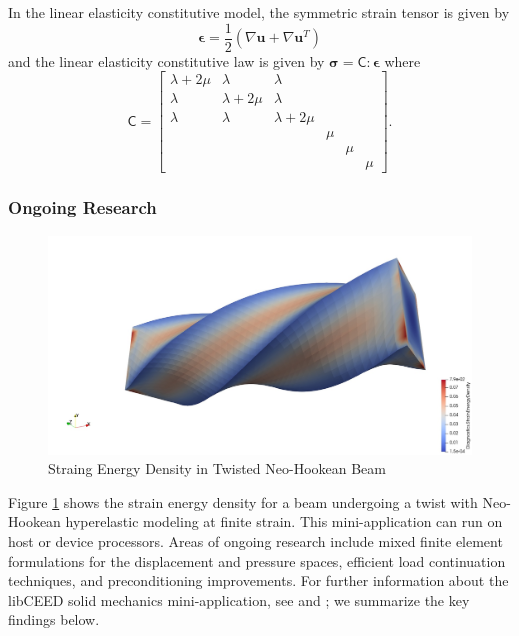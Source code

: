 In the linear elasticity constitutive model, the symmetric strain tensor is given by
\begin{equation}
\boldsymbol{\epsilon} = \frac{1}{2} \left( \nabla \mathbf{u} + \nabla \mathbf{u}^T \right)
\end{equation}
and the linear elasticity constitutive law is given by $\boldsymbol{\sigma} = \mathsf{C} : \boldsymbol{\epsilon}$ where
\begin{equation}
\mathsf{C} =
\begin{bmatrix}
   \lambda + 2\mu & \lambda & \lambda & & & \\
   \lambda & \lambda + 2\mu & \lambda & & & \\
   \lambda & \lambda & \lambda + 2\mu & & & \\
   & & & \mu & & \\
   & & & & \mu & \\
   & & & & & \mu
\end{bmatrix}.
\end{equation}

\subsubsection{Ongoing Research}

\begin{figure}[ht!]
\includegraphics[width=.99\linewidth]{../img/SolidTwistExample}
\caption{Straing Energy Density in Twisted Neo-Hookean Beam}
\label{fig:solidtwist}
\end{figure}

Figure \ref{fig:solidtwist} shows the strain energy density for a beam undergoing a twist with Neo-Hookean hyperelastic modeling at finite strain.
This mini-application can run on host or device processors.
Areas of ongoing research include mixed finite element formulations for the displacement and pressure spaces, efficient load continuation techniques, and preconditioning improvements.
For further information about the libCEED solid mechanics mini-application, see \cite{imece2020} and \cite{mehraban2021simulating}; we summarize the key findings below.

